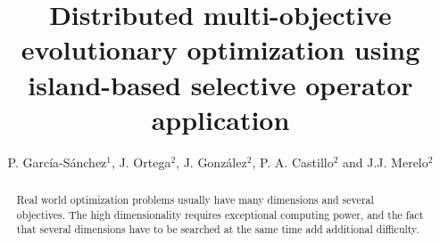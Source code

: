 \documentclass[preprint]{elsarticle}
\begin{document}
\begin{frontmatter}

\title{Distributed multi-objective evolutionary optimization using island-based selective operator application}


\author{P. Garc\'ia-S\'anchez$^1$, J. Ortega$^2$, J. Gonz\'alez$^2$, P. A. Castillo$^2$ and J.J. Merelo$^2$}
\address{
$^1$ Department of Computer Science and Engineering. ESI. University of C\'adiz, Spain\\
$^2$ Department of Computer Architecture and Computer Technology.\\ ETSIIT - CITIC. University of Granada, Spain\\
}


\begin{abstract}

  Real world optimization problems usually have many dimensions and
  several objectives. The high dimensionality requires exceptional
  computing power, and the fact that several dimensions have to be
  searched at the same time add additional difficulty.
  

\end{abstract}
\end{frontmatter}
\end{document}

